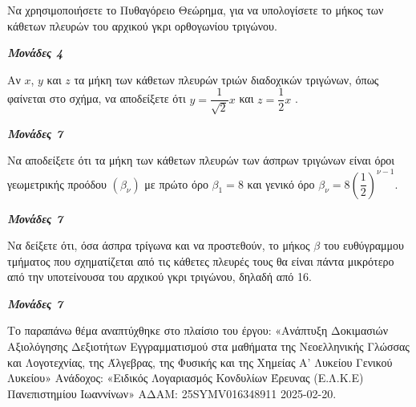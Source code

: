 \documentclass[11pt,a4paper,twoside]{book}
\newcommand{\monades}[1]{
\hspace*{\fill}
\textbf{\textit{\textcolor{maincolor}{Μονάδες #1}}}}
\begin{document}
\begin{alist}
\item Να χρησιμοποιήσετε το Πυθαγόρειο Θεώρημα, για να υπολογίσετε το μήκος των κάθετων πλευρών του αρχικού γκρι ορθογωνίου τριγώνου.
\monades{4}
\item

\end{alist}
\begin{alist}
\item
  Αν $x$, $y$ και $z$ τα μήκη των κάθετων πλευρών τριών διαδοχικών τριγώνων, όπως φαίνεται στο σχήμα, να αποδείξετε ότι $y = \dfrac{1}{\sqrt{2}}x$ και $z = \dfrac{1}{2}x$ .
\monades{7}
\end{alist}
\begin{marginfigure}

\end{marginfigure}
\begin{alist}
\item
  Να αποδείξετε ότι τα μήκη των κάθετων πλευρών των άσπρων τριγώνων είναι όροι γεωμετρικής προόδου $\left( \beta_{\nu} \right)$ με πρώτο όρο $\beta_{1} = 8$ και γενικό όρο $\beta_{\nu} = 8\left( \dfrac{1}{2} \right)^{\nu - 1}$.
\monades{7}
\item Να δείξετε ότι, όσα άσπρα τρίγωνα και να προστεθούν, το μήκος $\beta$ του ευθύγραμμου τμήματος που σχηματίζεται από τις κάθετες πλευρές τους θα είναι πάντα μικρότερο από την υποτείνουσα του αρχικού γκρι τριγώνου, δηλαδή από 16.
\monades{7}

{\footnotesize Το παραπάνω θέμα αναπτύχθηκε στο πλαίσιο του έργου: «Ανάπτυξη Δοκιμασιών Αξιολόγησης Δεξιοτήτων Εγγραμματισμού στα μαθήματα της Νεοελληνικής Γλώσσας και Λογοτεχνίας, της Άλγεβρας, της Φυσικής και της Χημείας Α' Λυκείου Γενικού Λυκείου» Ανάδοχος: «Ειδικός Λογαριασμός Κονδυλίων Έρευνας (Ε.Λ.Κ.Ε) Πανεπιστημίου Ιωαννίνων» ΑΔΑΜ: 25SYMV016348911 2025-02-20.}
\end{alist}
\end{document}
